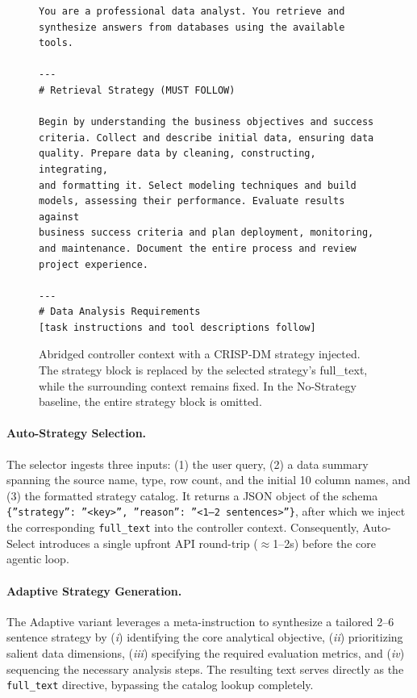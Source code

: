 \begin{figure}[t]
  \centering
  \scriptsize
  \begin{lstlisting}[basicstyle=\ttfamily\scriptsize,breaklines=true]
You are a professional data analyst. You retrieve and
synthesize answers from databases using the available tools.

---
# Retrieval Strategy (MUST FOLLOW)

Begin by understanding the business objectives and success
criteria. Collect and describe initial data, ensuring data
quality. Prepare data by cleaning, constructing, integrating,
and formatting it. Select modeling techniques and build
models, assessing their performance. Evaluate results against
business success criteria and plan deployment, monitoring,
and maintenance. Document the entire process and review
project experience.

---
# Data Analysis Requirements
[task instructions and tool descriptions follow]
  \end{lstlisting}
  \caption{Abridged controller context with a CRISP-DM strategy injected. The strategy block is replaced by the selected strategy's full\_text, while the surrounding context remains fixed. In the No-Strategy baseline, the entire strategy block is omitted.}
  \label{fig:injection}
\end{figure}

\paragraph{Auto-Strategy Selection.}
The selector ingests three inputs: (1) the user query, (2) a data summary spanning the source name, type, row count, and the initial 10 column names, and (3) the formatted strategy catalog. It returns a JSON object of the schema \texttt{\{''strategy'': ''<key>'', ''reason'': ''<1--2 sentences>''\}}, after which we inject the corresponding \texttt{full\_text} into the controller context. Consequently, Auto-Select introduces a single upfront API round-trip ($\approx$1--2s) before the core agentic loop.

\paragraph{Adaptive Strategy Generation.}
The Adaptive variant leverages a meta-instruction to synthesize a tailored 2--6 sentence strategy by (\emph{i}) identifying the core analytical objective, (\emph{ii}) prioritizing salient data dimensions, (\emph{iii}) specifying the required evaluation metrics, and (\emph{iv}) sequencing the necessary analysis steps. The resulting text serves directly as the \texttt{full\_text} directive, bypassing the catalog lookup completely.

